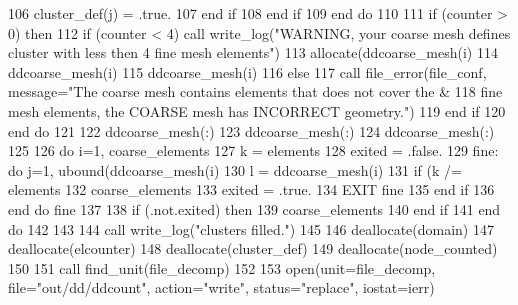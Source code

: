 \begin{DoxyCode}
106               cluster\_def(j) = .true.
107 \textcolor{keywordflow}{            end if}
108 \textcolor{keywordflow}{          end if}
109 \textcolor{keywordflow}{        end do}
110 
111         \textcolor{keywordflow}{if} (counter > 0) \textcolor{keywordflow}{then}
112           \textcolor{keywordflow}{if} (counter < 4) \textcolor{keyword}{call }write_log(\textcolor{stringliteral}{"WARNING, your coarse mesh defines cluster with less then 4 fine
       mesh elements"}\textcolor{comment}{)}
113 \textcolor{comment}{          }\textcolor{keyword}{allocate}(ddcoarse_mesh(i)%
114           ddcoarse_mesh(i)%
115           ddcoarse_mesh(i)%
116         \textcolor{keywordflow}{else}
117           \textcolor{keyword}{call }file_error(file\_conf, message=\textcolor{stringliteral}{"The coarse mesh contains elements that does not cover the &}
118 \textcolor{stringliteral}{}\textcolor{stringliteral}{          fine mesh elements, the COARSE mesh has INCORRECT geometry."})
119 \textcolor{keywordflow}{        end if}
120 \textcolor{keywordflow}{      end do}
121 
122       ddcoarse_mesh(:)%
123       ddcoarse_mesh(:)%
124       ddcoarse_mesh(:)%
125       
126       \textcolor{keywordflow}{do} i=1, coarse_elements%
127         k = elements%
128         exited = .false.
129         fine:  \textcolor{keywordflow}{do} j=1, ubound(ddcoarse_mesh(i)%
130             l = ddcoarse_mesh(i)%
131             \textcolor{keywordflow}{if} (k /= elements%
132               coarse_elements%
133               exited = .true.
134               \textcolor{keywordflow}{EXIT} fine
135 \textcolor{keywordflow}{            end if}
136 \textcolor{keywordflow}{        end do} fine
137          
138         \textcolor{keywordflow}{if} (.not.exited) \textcolor{keywordflow}{then}
139           coarse_elements%
140 \textcolor{keywordflow}{        end if}
141 \textcolor{keywordflow}{      end do}
142  
143 
144       \textcolor{keyword}{call }write_log(\textcolor{stringliteral}{"clusters filled."})
145       
146       \textcolor{keyword}{deallocate}(domain)
147       \textcolor{keyword}{deallocate}(elcounter)
148       \textcolor{keyword}{deallocate}(cluster\_def)
149       \textcolor{keyword}{deallocate}(node\_counted)
150             
151       \textcolor{keyword}{call }find_unit(file_decomp)
152       
153       \textcolor{keyword}{open}(unit=file_decomp, file=\textcolor{stringliteral}{"out/dd/ddcount"}, action=\textcolor{stringliteral}{"write"}, status\textcolor{comment}{=}\textcolor{stringliteral}{"replace"}\textcolor{comment}{, iostat=ierr)}

\end{DoxyCode}
